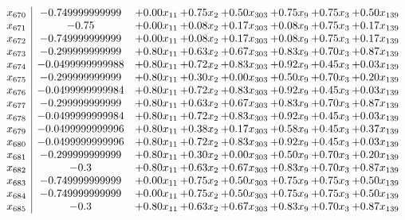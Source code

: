\documentclass[8pt]{article}
\begin{document}
\[\begin{array}{c| c c@{\hskip 2pt} c@{\hskip 2pt} c@{\hskip 2pt} c@{\hskip 2pt} c@{\hskip 2pt} c@{\hskip 2pt} }
 x_{670}   &  -0.749999999999 & +  0.00 x_{11} & +  0.75 x_{2} & +  0.50 x_{303} & +  0.75 x_{9} & +  0.75 x_{3} & +  0.50 x_{139}\\
 x_{671}   &  -0.75 & +  0.00 x_{11} & +  0.08 x_{2} & +  0.17 x_{303} & +  0.08 x_{9} & +  0.75 x_{3} & +  0.17 x_{139}\\
 x_{672}   &  -0.749999999999 & +  0.00 x_{11} & +  0.08 x_{2} & +  0.17 x_{303} & +  0.08 x_{9} & +  0.75 x_{3} & +  0.17 x_{139}\\
 x_{673}   &  -0.299999999999 & +  0.80 x_{11} & +  0.63 x_{2} & +  0.67 x_{303} & +  0.83 x_{9} & +  0.70 x_{3} & +  0.87 x_{139}\\
 x_{674}   &  -0.0499999999988 & +  0.80 x_{11} & +  0.72 x_{2} & +  0.83 x_{303} & +  0.92 x_{9} & +  0.45 x_{3} & +  0.03 x_{139}\\
 x_{675}   &  -0.299999999999 & +  0.80 x_{11} & +  0.30 x_{2} & +  0.00 x_{303} & +  0.50 x_{9} & +  0.70 x_{3} & +  0.20 x_{139}\\
 x_{676}   &  -0.0499999999984 & +  0.80 x_{11} & +  0.72 x_{2} & +  0.83 x_{303} & +  0.92 x_{9} & +  0.45 x_{3} & +  0.03 x_{139}\\
 x_{677}   &  -0.299999999999 & +  0.80 x_{11} & +  0.63 x_{2} & +  0.67 x_{303} & +  0.83 x_{9} & +  0.70 x_{3} & +  0.87 x_{139}\\
 x_{678}   &  -0.0499999999984 & +  0.80 x_{11} & +  0.72 x_{2} & +  0.83 x_{303} & +  0.92 x_{9} & +  0.45 x_{3} & +  0.03 x_{139}\\
 x_{679}   &  -0.0499999999996 & +  0.80 x_{11} & +  0.38 x_{2} & +  0.17 x_{303} & +  0.58 x_{9} & +  0.45 x_{3} & +  0.37 x_{139}\\
 x_{680}   &  -0.0499999999996 & +  0.80 x_{11} & +  0.72 x_{2} & +  0.83 x_{303} & +  0.92 x_{9} & +  0.45 x_{3} & +  0.03 x_{139}\\
 x_{681}   &  -0.299999999999 & +  0.80 x_{11} & +  0.30 x_{2} & +  0.00 x_{303} & +  0.50 x_{9} & +  0.70 x_{3} & +  0.20 x_{139}\\
 x_{682}   &  -0.3 & +  0.80 x_{11} & +  0.63 x_{2} & +  0.67 x_{303} & +  0.83 x_{9} & +  0.70 x_{3} & +  0.87 x_{139}\\
 x_{683}   &  -0.749999999999 & +  0.00 x_{11} & +  0.75 x_{2} & +  0.50 x_{303} & +  0.75 x_{9} & +  0.75 x_{3} & +  0.50 x_{139}\\
 x_{684}   &  -0.749999999999 & +  0.00 x_{11} & +  0.75 x_{2} & +  0.50 x_{303} & +  0.75 x_{9} & +  0.75 x_{3} & +  0.50 x_{139}\\
 x_{685}   &  -0.3 & +  0.80 x_{11} & +  0.63 x_{2} & +  0.67 x_{303} & +  0.83 x_{9} & +  0.70 x_{3} & +  0.87 x_{139}\\

\end{array}\]
\end{document}

